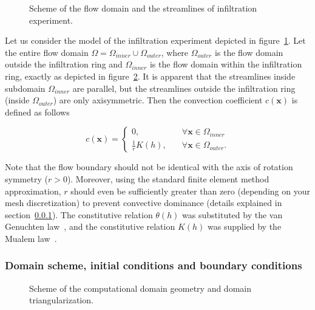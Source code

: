 \documentclass[review]{elsarticle}
\newenvironment{lineq}
    {\begin{linenomath*}
    \begin{equation}
    }
    { 
    \end{equation} 
    \end{linenomath*}
    }
\renewcommand{\vec}{\mathbf}
\begin{document}
 \begin{figure}
\centering
{}
 \caption{Scheme of the flow domain and the streamlines of infiltration experiment. }
 \label{valecproudy}
\end{figure}

Let us consider the model of the infiltration experiment depicted in figure~\ref{valecproudy}. Let the entire flow domain $\Omega=\Omega_{inner} \cup \Omega_{outer}$, where $\Omega_{outer}$ is the flow domain outside the infiltration ring and $\Omega_{inner}$ is the flow domain within the infiltration ring, exactly as depicted in figure~\ref{valec}. It is apparent that the streamlines inside subdomain $\Omega_{inner}$ are parallel, but the streamlines outside the infiltration ring (inside $\Omega_{outer}$) are only axisymmetric.  Then the convection coefficient $c(\vec{x})$ is defined as follows
\begin{lineq}
\label{convect}
c(\vec{x}) = \begin{cases}
	     0 , \quad &\forall \vec{x} \in \Omega_{inner} \\
	     \frac{1}{r}K(h) , \quad &\forall \vec{x} \in \Omega_{outer}.
	    \end{cases}
\end{lineq}
Note that  the flow boundary should not be identical with the axis of rotation symmetry ($r>0$). Moreover, using the standard finite element method approximation, $r$ should even be sufficiently greater than zero (depending on your mesh discretization) to prevent convective dominance (details explained in section~\ref{bccond}). The constitutive relation $\theta(h)$ was substituted by the van Genuchten law~\citep{vangenuchten}, and the constitutive relation $K(h)$ was supplied by the Mualem law~\citep{mualem}.





\subsubsection{Domain scheme, initial conditions and boundary conditions}%
\label{bccond}
 \begin{figure}
\centering
{}
 \caption{Scheme of the computational domain geometry and domain triangularization.}
 \label{valec}
\end{figure}
\end{document}
